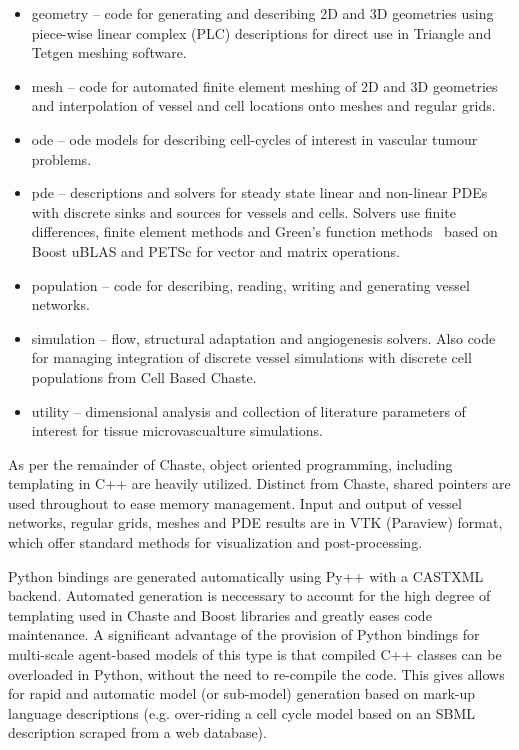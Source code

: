 \documentclass[10pt,letterpaper]{article}
\begin{document}
\begin{itemize}
	\item geometry -- code for generating and describing 2D and 3D geometries using piece-wise linear complex (PLC) descriptions for direct use in Triangle and Tetgen meshing software.
	\item mesh -- code for automated finite element meshing of 2D and 3D geometries and interpolation of vessel and cell locations onto meshes and regular grids. 
	\item ode -- ode models for describing cell-cycles of interest in vascular tumour problems.
	\item pde -- descriptions and solvers for steady state linear and non-linear PDEs with discrete sinks and sources for vessels and cells. Solvers use finite differences, finite element methods and Green's function methods~\cite{Secomb2013} based on Boost uBLAS and PETSc for vector and matrix operations.
	\item population -- code for describing, reading, writing and generating vessel networks.
	\item simulation -- flow, structural adaptation and angiogenesis solvers. Also code for managing integration of discrete vessel simulations with discrete cell populations from Cell Based Chaste.
	\item utility -- dimensional analysis and collection of literature parameters of interest for tissue microvascualture simulations.	
\end{itemize}

As per the remainder of Chaste, object oriented programming, including templating in C++ are heavily utilized. Distinct from Chaste, shared pointers are used throughout to ease memory management. Input and output of vessel networks, regular grids, meshes and PDE results are in VTK (Paraview) format, which offer standard methods for visualization and post-processing. 

Python bindings are generated automatically using Py++ with a CASTXML backend. Automated generation is neccessary to account for the high degree of templating used in Chaste and Boost libraries and greatly eases code maintenance. A significant advantage of the provision of Python bindings for multi-scale agent-based models of this type is that compiled C++ classes can be overloaded in Python, without the need to re-compile the code. This gives allows for rapid and automatic model (or sub-model) generation based on mark-up language descriptions (e.g. over-riding a cell cycle model based on an SBML description scraped from a web database).
\end{document}
